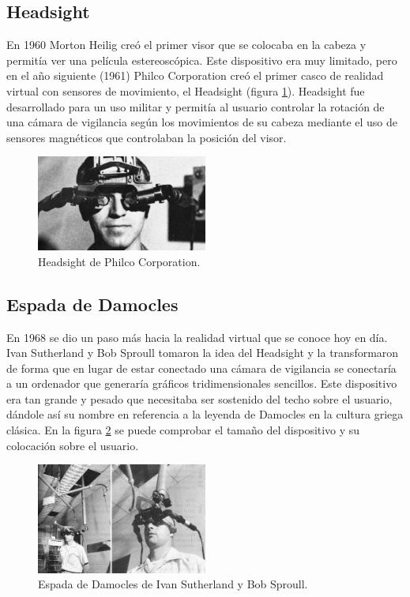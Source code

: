 \subsection{Headsight}

En 1960 Morton Heilig creó el primer visor que se colocaba en la cabeza y permitía ver una película estereoscópica. Este dispositivo era muy limitado, pero en el año siguiente (1961) Philco Corporation creó el primer casco de realidad virtual con sensores de movimiento, el Headsight (figura \ref{fig:EA_headsight}). Headsight fue desarrollado para un uso militar y permitía al usuario controlar la rotación de una cámara de vigilancia según los movimientos de su cabeza mediante el uso de sensores magnéticos que controlaban la posición del visor.



\begin{figure}[H]
  \centering
\includegraphics[width=0.5\textwidth]{03.EstudioProblema/01.EstadoArte/00.Figuras/15.headsight.png}
    \caption{Headsight de Philco Corporation. \cite{EA_img_headsight}}
    \label{fig:EA_headsight}
\end{figure}



\subsection{Espada de Damocles}

En 1968 se dio un paso más hacia la realidad virtual que se conoce hoy en día. Ivan Sutherland y Bob Sproull tomaron la idea del Headsight y la transformaron de forma que en lugar de estar conectado una cámara de vigilancia se conectaría a un ordenador que generaría gráficos tridimensionales sencillos. Este dispositivo era tan grande y pesado que necesitaba ser sostenido del techo sobre el usuario, dándole así su nombre en referencia a la leyenda de Damocles en la cultura griega clásica. En la figura \ref{fig:EA_damocles} se puede comprobar el tamaño del dispositivo y su colocación sobre el usuario.


\begin{figure}[H]
  \centering
\includegraphics[width=0.5\textwidth]{03.EstudioProblema/01.EstadoArte/00.Figuras/16.damocles.jpg}
    \caption{Espada de Damocles de Ivan Sutherland y Bob Sproull. \cite{EA_img_damocles}}
    \label{fig:EA_damocles}
\end{figure}


